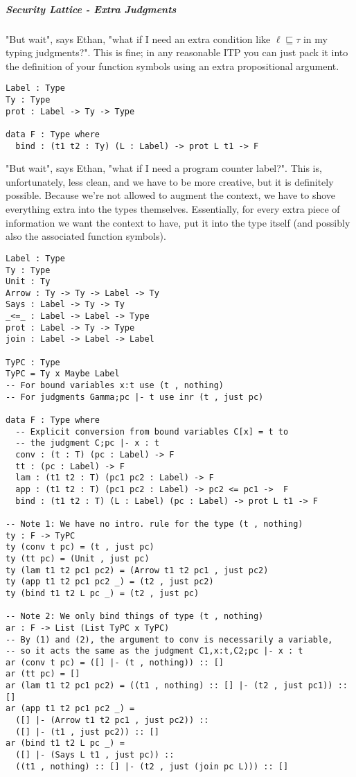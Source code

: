 \documentclass{article}
\theoremstyle{definition}
\begin{document}
\subparagraph{Security Lattice - Extra Judgments} "But wait", says Ethan, "what if I need an extra condition like $\ell \sqsubseteq \tau$ in my typing judgments?". This is fine; in any reasonable ITP you can just pack it into the definition of your function symbols using an extra propositional argument.
\begin{verbatim}
Label : Type
Ty : Type
prot : Label -> Ty -> Type

data F : Type where
  bind : (t1 t2 : Ty) (L : Label) -> prot L t1 -> F
\end{verbatim}
"But wait", says Ethan, "what if I need a program counter label?". This is, unfortunately, less clean, and we have to be more creative, but it is definitely possible. Because we're not allowed to augment the context, we have to shove everything extra into the types themselves. Essentially, for every extra piece of information we want the context to have, put it into the type itself (and possibly also the associated function symbols).
\begin{verbatim}		
Label : Type
Ty : Type
Unit : Ty
Arrow : Ty -> Ty -> Label -> Ty
Says : Label -> Ty -> Ty
_<=_ : Label -> Label -> Type
prot : Label -> Ty -> Type
join : Label -> Label -> Label

TyPC : Type
TyPC = Ty x Maybe Label
-- For bound variables x:t use (t , nothing)
-- For judgments Gamma;pc |- t use inr (t , just pc)

data F : Type where
  -- Explicit conversion from bound variables C[x] = t to
  -- the judgment C;pc |- x : t
  conv : (t : T) (pc : Label) -> F
  tt : (pc : Label) -> F
  lam : (t1 t2 : T) (pc1 pc2 : Label) -> F
  app : (t1 t2 : T) (pc1 pc2 : Label) -> pc2 <= pc1 ->  F
  bind : (t1 t2 : T) (L : Label) (pc : Label) -> prot L t1 -> F

-- Note 1: We have no intro. rule for the type (t , nothing)
ty : F -> TyPC
ty (conv t pc) = (t , just pc)
ty (tt pc) = (Unit , just pc)
ty (lam t1 t2 pc1 pc2) = (Arrow t1 t2 pc1 , just pc2)
ty (app t1 t2 pc1 pc2 _) = (t2 , just pc2)
ty (bind t1 t2 L pc _) = (t2 , just pc)

-- Note 2: We only bind things of type (t , nothing)
ar : F -> List (List TyPC x TyPC)
-- By (1) and (2), the argument to conv is necessarily a variable,
-- so it acts the same as the judgment C1,x:t,C2;pc |- x : t
ar (conv t pc) = ([] |- (t , nothing)) :: []
ar (tt pc) = []
ar (lam t1 t2 pc1 pc2) = ((t1 , nothing) :: [] |- (t2 , just pc1)) :: []
ar (app t1 t2 pc1 pc2 _) =
  ([] |- (Arrow t1 t2 pc1 , just pc2)) ::
  ([] |- (t1 , just pc2)) :: []
ar (bind t1 t2 L pc _) =
  ([] |- (Says L t1 , just pc)) ::
  ((t1 , nothing) :: [] |- (t2 , just (join pc L))) :: []
\end{verbatim}
\end{document}
